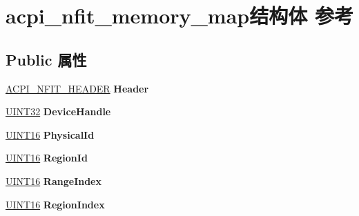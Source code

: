 \hypertarget{structacpi__nfit__memory__map}{}\section{acpi\+\_\+nfit\+\_\+memory\+\_\+map结构体 参考}
\label{structacpi__nfit__memory__map}
\subsection*{Public 属性}
\begin{DoxyCompactItemize}
\item 
\mbox{\label{structacpi__nfit__memory__map_ad25c36fa998f2b55a45dce79d7bd6838}} 
\hyperlink{structacpi__nfit__header}{A\+C\+P\+I\+\_\+\+N\+F\+I\+T\+\_\+\+H\+E\+A\+D\+ER} {\bfseries Header}
\item 
\mbox{\label{structacpi__nfit__memory__map_ab7607b387752dae9d67ef07638a8cb35}} 
\hyperlink{_processor_bind_8h_ae1e6edbbc26d6fbc71a90190d0266018}{U\+I\+N\+T32} {\bfseries Device\+Handle}
\item 
\mbox{\label{structacpi__nfit__memory__map_a95f95043f46d8bae45ef7dfa8a2bf571}} 
\hyperlink{_processor_bind_8h_a09f1a1fb2293e33483cc8d44aefb1eb1}{U\+I\+N\+T16} {\bfseries Physical\+Id}
\item 
\mbox{\label{structacpi__nfit__memory__map_a29ed5d1589cab7bf15bb5c5aa08d1836}} 
\hyperlink{_processor_bind_8h_a09f1a1fb2293e33483cc8d44aefb1eb1}{U\+I\+N\+T16} {\bfseries Region\+Id}
\item 
\mbox{\label{structacpi__nfit__memory__map_a38768827f4f689e15ea867f61defe14a}} 
\hyperlink{_processor_bind_8h_a09f1a1fb2293e33483cc8d44aefb1eb1}{U\+I\+N\+T16} {\bfseries Range\+Index}
\item 
\mbox{\label{structacpi__nfit__memory__map_a3898fb3d2e824adf2c17362ae1bd3994}} 
\hyperlink{_processor_bind_8h_a09f1a1fb2293e33483cc8d44aefb1eb1}{U\+I\+N\+T16} {\bfseries Region\+Index}
\item 
\mbox{\label{structacpi__nfit__memory__map_a6883cf83408e9ad95e1e7a70205ebf24}} 

\end{DoxyCompactItemize}
